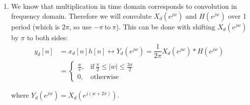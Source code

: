 \documentclass[10pt,a4paper, margin=1in]{article}
\begin{document}
\begin{enumerate}
\begin{enumerate}
    \item We know that multiplication in time domain corresponds to convolution in frequency domain. Therefore we will convolute $X_d(e^{jw})$ and $H(e^{jw})$ over 1 period (which is 2$\pi$, so use $-\pi \ \text{to} \ \pi$). This can be done with shifting $X_d(e^{jw})$ by $\pi$ to both sides: \\
    \begin{align*}
    y_d[n] &= x_d[n] h[n] \leftrightarrow Y_d(e^{jw}) = \dfrac{1}{2\pi}X_d(e^{jw}) * H(e^{jw}) \\
    &= \begin{cases}
        \frac{w}{\pi}, & \text{if}\ \frac{\pi}{2} \leq |w| \leq \frac{3\pi}{2} \\
        0, & \text{otherwise}
    \end{cases}
    \end{align*}
    \begin{center}
    where $Y_d(e^{jw}) = X_d(e^{j(w + 2\pi)})$.
    \end{center}
    \end{enumerate}

\end{enumerate}
\end{document}
